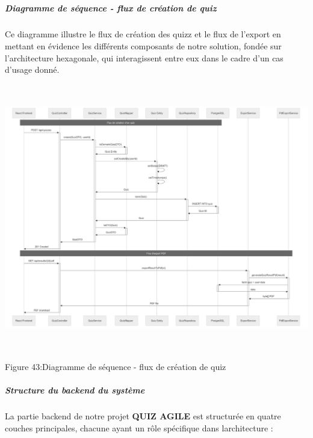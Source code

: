 \documentclass[12pt,a4paper,twoside,openright]{report}
\begin{document}
\hypertarget{section-6}{%
\subparagraph{}\label{section-6}}

\hypertarget{diagramme-de-suxe9quence---flux-de-cruxe9ation-de-quiz}{%
\subparagraph{\texorpdfstring{Diagramme de séquence - flux de création
de quiz
}{Diagramme de séquence - flux de création de quiz }}\label{diagramme-de-suxe9quence---flux-de-cruxe9ation-de-quiz}}

Ce diagramme illustre le flux de création des quizz et le flux de
l'export en mettant en évidence les différents composants de notre
solution, fondée sur l'architecture hexagonale, qui interagissent entre
eux dans le cadre d'un cas d'usage donné.

\includegraphics[width=6.3in,height=4.60318in]{latex_media/media/image49.png}

\protect\hypertarget{_Toc203823453}{}{}Figure 43:Diagramme de séquence -
flux de création de quiz

\hypertarget{structure-du-backend-du-systuxe8me}{%
\subparagraph{Structure du backend du
système}\label{structure-du-backend-du-systuxe8me}}

La partie backend de notre projet \textbf{QUIZ AGILE} est structurée en
quatre couches principales, chacune ayant un rôle spécifique dans
l\textquotesingle architecture :
\end{document}
